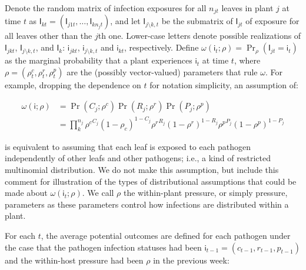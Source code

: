\documentclass[]{article}
\begin{document}
Denote the random matrix of infection exposures for all \(n_{jt}\)
leaves in plant \(j\) at time \(t\) as
\(\mathsf{I}_{kt} = (\mathsf{I}_{j1t} , \dots, \mathsf{I}_{kn_jt})\),
and let \(\mathsf{I}_{j \setminus k, t}\) be the submatrix of
\(\mathsf{I}_{jt}\) of exposure for all leaves other than the \(j\)th
one. Lower-case letters denote possible realizations of
\(\mathsf{I}_{jkt}\), \(\mathsf{I}_{j \setminus k, t}\), and
\(\mathsf{I}_{k}\): \(\mathsf{i}_{jkt}\),
\(\mathsf{i}_{j \setminus k, t}\) and \(\mathsf{i}_{kt}\), respectively.
Define
\(\omega(\mathsf{i}_{t}; \rho) = \Pr_{\rho}(\mathsf{I}_{jt} = \mathsf{i}_{t})\)
as the marginal probability that a plant experiences \(\mathsf{i}_t\) at
time \(t\), where \(\rho = (\rho^c_{t}, \rho^r_{t}, \rho^p_{t})\) are
the (possibly vector-valued) parameters that rule \(\omega\). For
example, dropping the dependence on \(t\) for notation simplicity, an
assumption of:

\begin{align*}
\omega(\mathsf{i}; \rho) &= \Pr(C_{j}; \rho^c) \Pr(R_{j}; \rho^r) \Pr(P_{j}; \rho^p) \\
&= \prod_{k}^{n_{j}} {\rho^c}^{C_j} (1 - \rho_c)^{1 - C_j} {\rho^r}^{R_j} (1 - \rho^r)^{1 - R_j} {\rho^p}^{P_j} (1 - \rho^p)^{1 - P_j}
\end{align*}

is equivalent to assuming that each leaf is exposed to each pathogen
independently of other leafs and other pathogens; i.e., a kind of
restricted multinomial distribution. We do not make this assumption, but
include this comment for illustration of the types of distributional
assumptions that could be made about \(\omega(\mathsf{i}_{t}; \rho)\).
We call \(\rho\) the within-plant pressure, or simply pressure,
parameters as these parameters control how infections are distributed
within a plant.

For each \(t\), the average potential outcomes are defined for each
pathogen under the case that the pathogen infection statuses had been
\(\mathsf{i}_{t - 1} = (c_{t -1}, r_{t-1}, p_{t-1})\) and the
within-host pressure had been \(\rho\) in the previous week:
\end{document}
